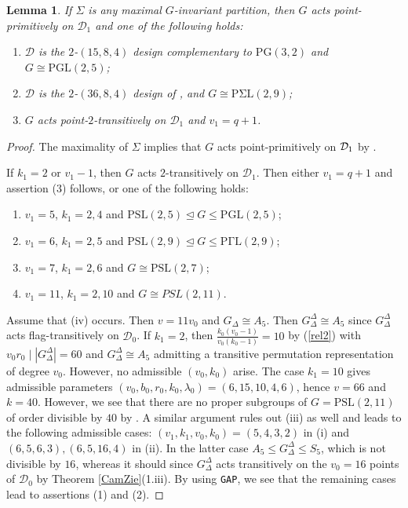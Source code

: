 \documentclass[a4paper,twopage,reqno,12pt]{amsart}
\newtheorem{lemma}[theorem]{Lemma}
\theoremstyle{definition}
\numberwithin{equation}{section}
\newcommand{\PSL}{\mathrm{PSL}}
\newcommand{\PGL}{\mathrm{PGL}}
\newcommand{\PGaL}{\mathrm{P\Gamma L}}
\newcommand{\PSigL}{\mathrm{P\Sigma L}}
\newcommand{\PG}{\mathrm{PG}}
\renewcommand{\leq}{\leqslant}
\begin{document}
\begin{lemma}\label{tris}
If $\Sigma $ is any maximal $G$-invariant partition, then $G$ acts
point-primitively on $\mathcal{D}_{1}$ and one of the following holds:
\begin{enumerate}
\item $\mathcal{D}$ is the $2$-$(15,8,4)$ design complementary to $\PG(3,2)$ and $ G \cong \PGL (2,5)$;
\item $\mathcal{D}$ is the $2$-$(36,8,4)$ design of \cite[Construction 9]{DP}, and $G\cong \PSigL(2,9)$;
\item $G$ acts point-$2$-transitively on $\mathcal{D}_{1}$ and $v_{1}=q+1$.
\end{enumerate}
\end{lemma}
\begin{proof}
The maximality of $\Sigma $ implies that $G$ acts point-primitively on $\mathcal{%
D}_{1}$ by \cite[Theorem 1.5A and Corollary 1.5A]{DM}.

If $k_{1}=2$ or $v_{1}-1$, then $G$ acts $2$-transitively on $\mathcal{D}_{1}$. Then either $v_{1}=q+1$ and assertion (3) follows, or one of the following holds:
\begin{enumerate}
    \item[(i)] $v_{1}=5$, $k_{1}=2,4$ and $\PSL(2,5) \unlhd G \leq \PGL (2,5)$;
    \item[(ii)] $v_{1}=6$, $k_{1}=2,5$ and $\PSL(2,9) \unlhd G \leq \PGaL (2,9)$;
    \item[(iii)] $v_{1}=7$, $k_{1}=2,6$ and $G \cong \PSL (2,7)$;
    \item[(iv)] $v_{1}=11$, $k_{1}=2,10$ and $G\cong PSL(2,11)$. 
\end{enumerate}    
Assume that (iv) occurs. Then $v=11v_{0}$ and $G_{\Delta}\cong A_{5}$. Then $G_{\Delta}^{\Delta}\cong A_{5}$ since $G_{\Delta}^{\Delta}$ acts flag-transitively on $\mathcal{D}_{0}$. If $k_{1}=2$, then $\frac{k_{0}(v_{0}-1)}{v_{0}(k_{0}-1)}=10$ by (\ref{rel2}) with $v_{0}r_{0} \mid \left\vert G_{\Delta}^{\Delta}\right\vert=60$ and $G_{\Delta}^{\Delta}\cong A_{5}$ admitting a transitive permutation representation of degree $v_{0}$. However, no admissible $(v_{0},k_{0})$ arise. The case $k_{1}=10$ gives admissible parameters $(v_0,b_0,r_0,k_0,\lambda_0)=(6, 15, 10, 4, 6)$, hence $v=66$ and $k=40$. However, we see that there are no proper subgroups of $G=\PSL(2,11)$ of order divisible by $40$ by \cite{At}. A similar argument rules out (iii) as well and leads to the following admissible cases: $(v_{1},k_{1},v_{0},k_{0})=(5,4,3,2)$ in (i) and $(6,5,6,3),(6,5,16,4)$ in (ii). In the latter case $A_{5}\leq G_{\Delta}^{\Delta}\leq S_{5}$, which is not divisible by $16$, whereas it should since $G_{\Delta}^{\Delta}$ acts transitively on the $v_{0}=16$ points of $\mathcal{D}_{0}$ by Theorem \ref{CamZie}(1.iii). By using \texttt{GAP}, we see that the remaining cases lead to assertions (1) and (2).
    

\end{proof}
\end{document}
